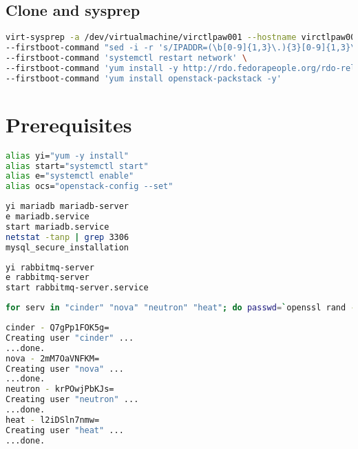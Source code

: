 \documentclass[11pt,letterpaper,oneside]{book}
\begin{document}
\section{Clone and sysprep}
\begin{lstlisting}[caption={Sysprep example},language=bash]
virt-sysprep -a /dev/virtualmachine/virctlpaw001 --hostname virctlpaw001.virtomation.com \
--firstboot-command "sed -i -r 's/IPADDR=(\b[0-9]{1,3}\.){3}[0-9]{1,3}\b'/IPADDR=10.53.252.61/ /etc/sysconfig/network-scripts/ifcfg-eth0" \
--firstboot-command 'systemctl restart network' \
--firstboot-command 'yum install -y http://rdo.fedorapeople.org/rdo-release.rpm' \
--firstboot-command 'yum install openstack-packstack -y' 
\end{lstlisting}

\chapter{Prerequisites}

\begin{lstlisting}[caption={Bash Aliases},language=bash]
alias yi="yum -y install"
alias start="systemctl start"
alias e="systemctl enable"
alias ocs="openstack-config --set"
\end{lstlisting}

\begin{lstlisting}[caption={Database Install},language=bash]
yi mariadb mariadb-server
e mariadb.service 
start mariadb.service 
netstat -tanp | grep 3306
mysql_secure_installation 
\end{lstlisting}

\begin{lstlisting}[caption={RabbitMQ Install},language=bash]
yi rabbitmq-server
e rabbitmq-server
start rabbitmq-server.service
\end{lstlisting}

\begin{lstlisting}[caption={Create RabbitMQ User Accounts},language=bash]
for serv in "cinder" "nova" "neutron" "heat"; do passwd=`openssl rand -base64 8`; echo "$serv - $passwd"; rabbitmqctl add_user $serv $passwd; done
\end{lstlisting}


\begin{lstlisting}[caption={Result from user account creation},language=bash]
cinder - Q7gPp1FOK5g=
Creating user "cinder" ...
...done.
nova - 2mM7OaVNFKM=
Creating user "nova" ...
...done.
neutron - krPOwjPbKJs=
Creating user "neutron" ...
...done.
heat - l2iDSln7nmw=
Creating user "heat" ...
...done.
\end{lstlisting}
\end{document}
